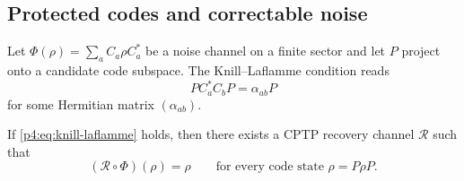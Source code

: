 \documentclass[12pt,a4paper]{article}
\begin{document}
\subsection{Protected codes and correctable noise}
\label{p4:sec:part3-qec}

Let $\Phi(\rho)=\sum_a C_a\rho C_a^*$ be a noise channel on a finite sector and let $P$ project onto a candidate code subspace.
The Knill--Laflamme condition reads \cite{KnillLaflamme1997,NielsenChuang2010}
\begin{equation}
\label{p4:eq:knill-laflamme}
PC_a^*C_bP = \alpha_{ab}P
\end{equation}
for some Hermitian matrix $(\alpha_{ab})$.


\begin{theorem}
\label{p4:thm:finite-kl-recovery}
If \eqref{p4:eq:knill-laflamme} holds, then there exists a CPTP recovery channel \(\mathcal R\) such that
\[
(\mathcal R\circ\Phi)(\rho)=\rho
\qquad
\text{for every code state }\rho=P\rho P.
\]
\end{theorem}
\end{document}
